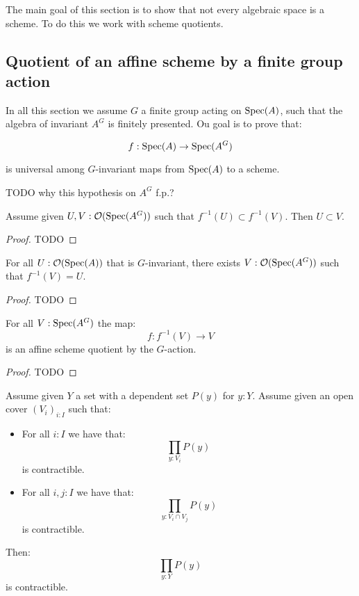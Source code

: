 The main goal of this section is to show that not every algebraic space is a scheme. To do this we work with scheme quotients.

\subsection{Quotient of an affine scheme by a finite group action}

In all this section we assume $G$ a finite group acting on $\operatorname{Spec}(A)$, such that the algebra of invariant $A^G$ is finitely presented. Ou goal is to prove that:

\[f:\operatorname{Spec}(A)\to \operatorname{Spec}(A^G)\] 

is universal among $G$-invariant maps from $\operatorname{Spec}(A)$ to a scheme.

\begin{remark}
TODO why this hypothesis on $A^G$ f.p.?
\end{remark}

\begin{lemma}\label{injective-on-open}
Assume given $U,V:\mathcal{O}(\operatorname{Spec}(A^G))$ such that $f^{-1}(U) \subset f^{-1}(V)$. Then $U\subset V$. 
\end{lemma}

\begin{proof}
TODO
\end{proof}

\begin{lemma}\label{surjective-on-open}
For all $U: \mathcal{O}(\operatorname{Spec}(A))$ that is $G$-invariant, there exists $V:\mathcal{O}(\operatorname{Spec}(A^G))$ such that $f^{-1}(V)=U$.
\end{lemma}

\begin{proof}
TODO
\end{proof}

\begin{lemma}\label{affine-scheme-quotient-on-open}
For all $V:\operatorname{Spec}(A^G)$ the map:
\[f : f^{-1}(V) \to V\]
is an affine scheme quotient by the $G$-action.
\end{lemma}

\begin{proof}
TODO
\end{proof}

\begin{lemma}\label{piece-wise-contractible}
Assume given $Y$ a set with a dependent set $P(y)$ for $y:Y$. Assume given an open cover $(V_i)_{i:I}$ such that:
\begin{itemize}
\item For all $i:I$ we have that:
\[\prod_{y:V_i} P(y)\]
is contractible.
\item For all $i,j:I$ we have that:
\[\prod_{y:V_i\cap V_j} P(y)\]
is contractible.
\end{itemize}
Then:
\[\prod_{y:Y} P(y)\]
is contractible.
\end{lemma}

